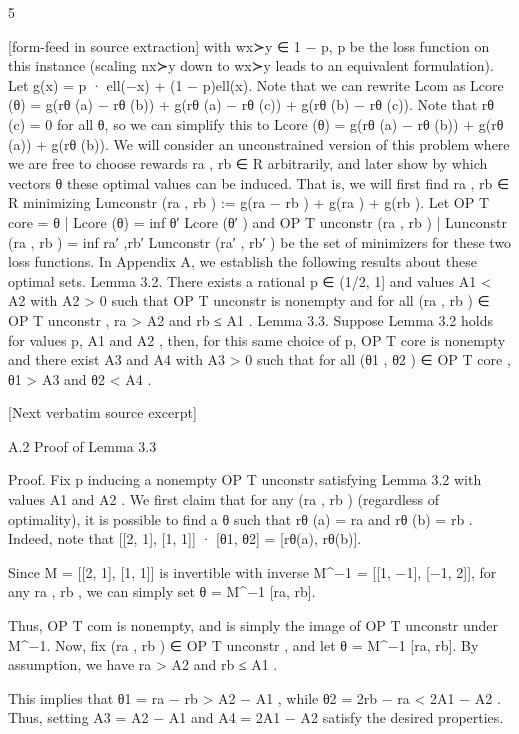 \documentclass[10pt]{article}
\begin{document}
\begin{ReviewVerbatim}
                                                        5

[form-feed in source extraction]
with wx≻y ∈ {1 − p, p} be the loss function on this instance (scaling nx≻y down to wx≻y leads to
an equivalent formulation). Let g(x) = p · ell(−x) + (1 − p)ell(x). Note that we can rewrite Lcom as
                    Lcore (θ) = g(rθ (a) − rθ (b)) + g(rθ (a) − rθ (c)) + g(rθ (b) − rθ (c)).
Note that rθ (c) = 0 for all θ, so we can simplify this to
                              Lcore (θ) = g(rθ (a) − rθ (b)) + g(rθ (a)) + g(rθ (b)).
We will consider an unconstrained version of this problem where we are free to choose rewards
ra , rb ∈ R arbitrarily, and later show by which vectors θ these optimal values can be induced. That
is, we will first find ra , rb ∈ R minimizing
                                Lunconstr (ra , rb ) := g(ra − rb ) + g(ra ) + g(rb ).
Let OP T core = {θ | Lcore (θ) = inf θ′ Lcore (θ′ )} and OP T unconstr {(ra , rb ) | Lunconstr (ra , rb ) =
inf ra′ ,rb′ Lunconstr (ra′ , rb′ )} be the set of minimizers for these two loss functions. In Appendix A, we
establish the following results about these optimal sets.
Lemma 3.2. There exists a rational p ∈ (1/2, 1] and values A1 < A2 with A2 > 0 such that
OP T unconstr is nonempty and for all (ra , rb ) ∈ OP T unconstr , ra > A2 and rb ≤ A1 .
Lemma 3.3. Suppose Lemma 3.2 holds for values p, A1 and A2 , then, for this same choice of p,
OP T core is nonempty and there exist A3 and A4 with A3 > 0 such that for all (θ1 , θ2 ) ∈ OP T core ,
θ1 > A3 and θ2 < A4 .

[Next verbatim source excerpt]

A.2   Proof of Lemma 3.3

Proof. Fix p inducing a nonempty OP T unconstr satisfying Lemma 3.2 with values A1 and A2 .
We first claim that for any (ra , rb ) (regardless of optimality), it is possible to find a θ such that
rθ (a) = ra and rθ (b) = rb . Indeed, note that
                                     [[2, 1], [1, 1]] · [θ1, θ2] = [rθ(a), rθ(b)].

Since M = [[2, 1],
           [1, 1]] is invertible with inverse
                                         M^−1 = [[1, −1],
                                                 [−1, 2]],
for any ra , rb , we can simply set
                                             θ = M^−1 [ra, rb].

Thus, OP T com is nonempty, and is simply the image of OP T unconstr
under M^−1. Now, fix
(ra , rb ) ∈ OP T unconstr ,
and let θ = M^−1 [ra, rb].
By assumption, we have ra > A2 and rb ≤ A1 .









This implies that θ1 = ra − rb > A2 − A1 , while θ2 = 2rb − ra < 2A1 − A2 . Thus, setting
A3 = A2 − A1 and A4 = 2A1 − A2 satisfy the desired properties.
\end{ReviewVerbatim}
\end{document}
